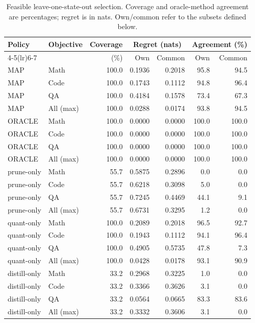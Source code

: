 \begin{table}[H]
\centering
\small
\setlength{\tabcolsep}{3pt}
\caption{Feasible leave-one-state-out selection. Coverage and oracle-method agreement are percentages; regret is in nats. Own/common refer to the subsets defined below.}
\label{tab:selection-feasible}
\begin{tabular}{llrrrrr}
\toprule
Policy & Objective & Coverage & \multicolumn{2}{c}{Regret (nats)} & \multicolumn{2}{c}{Agreement (\%)} \\
\cmidrule(lr){4-5}\cmidrule(lr){6-7}
 & & (\%) & Own & Common & Own & Common \\
\midrule
MAP & Math & 100.0 & 0.1936 & 0.2018 & 95.8 & 94.5 \\
MAP & Code & 100.0 & 0.1743 & 0.1112 & 94.8 & 96.4 \\
MAP & QA & 100.0 & 0.4184 & 0.1578 & 73.4 & 67.3 \\
MAP & All (max) & 100.0 & 0.0288 & 0.0174 & 93.8 & 94.5 \\
\midrule
ORACLE & Math & 100.0 & 0.0000 & 0.0000 & 100.0 & 100.0 \\
ORACLE & Code & 100.0 & 0.0000 & 0.0000 & 100.0 & 100.0 \\
ORACLE & QA & 100.0 & 0.0000 & 0.0000 & 100.0 & 100.0 \\
ORACLE & All (max) & 100.0 & 0.0000 & 0.0000 & 100.0 & 100.0 \\
\midrule
prune-only & Math & 55.7 & 0.5875 & 0.2896 & 0.0 & 0.0 \\
prune-only & Code & 55.7 & 0.6218 & 0.3098 & 5.0 & 0.0 \\
prune-only & QA & 55.7 & 0.7245 & 0.4469 & 44.1 & 9.1 \\
prune-only & All (max) & 55.7 & 0.6731 & 0.3295 & 1.2 & 0.0 \\
\midrule
quant-only & Math & 100.0 & 0.2089 & 0.2018 & 96.5 & 92.7 \\
quant-only & Code & 100.0 & 0.1943 & 0.1112 & 94.1 & 96.4 \\
quant-only & QA & 100.0 & 0.4905 & 0.5735 & 47.8 & 7.3 \\
quant-only & All (max) & 100.0 & 0.0428 & 0.0178 & 93.1 & 90.9 \\
\midrule
distill-only & Math & 33.2 & 0.2968 & 0.3225 & 1.0 & 0.0 \\
distill-only & Code & 33.2 & 0.3366 & 0.3626 & 3.1 & 0.0 \\
distill-only & QA & 33.2 & 0.0564 & 0.0665 & 83.3 & 83.6 \\
distill-only & All (max) & 33.2 & 0.3332 & 0.3606 & 3.1 & 0.0 \\

\end{tabular}
\end{table}
